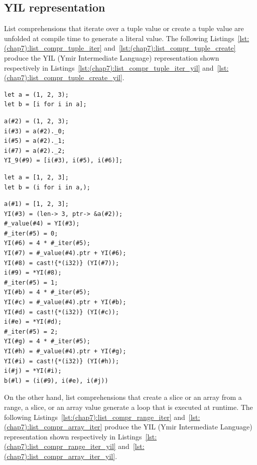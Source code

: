 \subsection {YIL representation}

List comprehensions that iterate over a tuple value or create a tuple value are
unfolded at compile time to generate a literal value. The following
Listings~\ref{lst:(chap7):list_compr_tuple_iter} and~\ref{lst:(chap7):list_compr_tuple_create}
produce the YIL (Ymir Intermediate Language) representation shown respectively
in Listings~\ref{lst:(chap7):list_compr_tuple_iter_yil}
and~\ref{lst:(chap7):list_compr_tuple_create_yil}.

\begin{lstlisting}[style=coloredverbatim, label=lst:(chap7):list_compr_tuple_iter, caption=List comprehension iterating over a tuple]
let a = (1, 2, 3);
let b = [i for i in a];
\end{lstlisting}

\begin{lstlisting}[style=lyilVerb, label=lst:(chap7):list_compr_tuple_iter_yil, caption=YIL representation of Listing~\ref{lst:(chap7):list_compr_tuple_iter}]
a(#2) = (1, 2, 3);
i(#3) = a(#2)._0;
i(#5) = a(#2)._1;
i(#7) = a(#2)._2;
YI_9(#9) = [i(#3), i(#5), i(#6)];
\end{lstlisting}

\begin{lstlisting}[style=coloredverbatim, label=lst:(chap7):list_compr_tuple_create, caption=List comprehension iterating over a tuple]
let a = [1, 2, 3];
let b = (i for i in a,);
\end{lstlisting}

\begin{lstlisting}[style=lyilVerb, label=lst:(chap7):list_compr_tuple_create_yil, caption=YIL representation of Listing~\ref{lst:(chap7):list_compr_tuple_create}]
a(#1) = [1, 2, 3];
YI(#3) = (len-> 3, ptr-> &a(#2));
#_value(#4) = YI(#3);
#_iter(#5) = 0;
YI(#6) = 4 * #_iter(#5);
YI(#7) = #_value(#4).ptr + YI(#6);
YI(#8) = cast!{*(i32)} (YI(#7));
i(#9) = *YI(#8);
#_iter(#5) = 1;
YI(#b) = 4 * #_iter(#5);
YI(#c) = #_value(#4).ptr + YI(#b);
YI(#d) = cast!{*(i32)} (YI(#c));
i(#e) = *YI(#d);
#_iter(#5) = 2;
YI(#g) = 4 * #_iter(#5);
YI(#h) = #_value(#4).ptr + YI(#g);
YI(#i) = cast!{*(i32)} (YI(#h));
i(#j) = *YI(#i);
b(#l) = (i(#9), i(#e), i(#j))
\end{lstlisting}

On the other hand, list comprehensions that create a slice or an array from a
range, a slice, or an array value generate a loop that is executed at runtime.
The following Listings~\ref{lst:(chap7):list_compr_range_iter}
and~\ref{lst:(chap7):list_compr_array_iter} produce the YIL (Ymir Intermediate Language)
representation shown respectively in
Listings~\ref{lst:(chap7):list_compr_range_iter_yil}
and~\ref{lst:(chap7):list_compr_array_iter_yil}.

